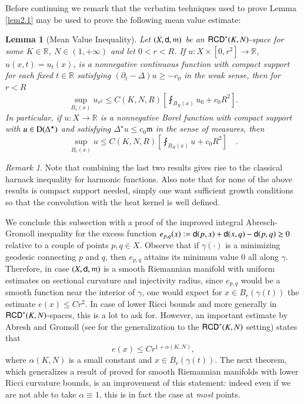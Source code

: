 \documentclass[11pt,reqno]{amsart}
\newcommand{\dom}{\rm D}
\newcommand{\mm}{\mathfrak m}
\newcommand{\sfd}{{\sf d}}
\newcommand{\R}{\mathbb{R}}
\newcommand{\RCD}{{\sf RCD}}
\newtheorem{lemma}[theorem]{Lemma}
\theoremstyle{definition}
\theoremstyle{remark}
\newtheorem{remark}{Remark}[section]
\theoremstyle{remark}
\theoremstyle{remark}
\theoremstyle{remark}
\theoremstyle{remark}
\theoremstyle{remark}
\theoremstyle{remark}
\begin{document}
Before continuing we remark that the verbatim techniques used to prove Lemma \ref{lem2.1} may be used to prove the following mean value estimate:

\begin{lemma}[Mean Value Inequality]
Let $(X,\sfd,\mm)$ be an  $\RCD^*(K,N)$-space for some $K \in \R$, $N \in (1,+\infty)$ and let $0<r<R$. If $u:X \times [0,r^2]\to \R$, $u(x,t)=u_t(x)$,  is a nonnegative  continuous function with compact support for each fixed $t\in \R$ satisfying $(\partial_t - \Delta) u \geq -c_0$ in the weak sense, then for $r<R$
\begin{equation}
\sup_{B_r(x)}u_{r^2} \leq C(K,N,R) \left[ \fint_{B_R(x)}u_{0}+ c_0 R^2 \right].
\end{equation}
In particular, if $u:X\to \R$ is a nonnegative Borel function with compact support with $u \in \dom(\Delta^\star)$ and satisfying $\Delta^\star u \leq c_0 \mm$ in the sense of measures, then
\begin{equation}\label{eq:MeanValueConst}
\sup_{B_r(x)} u \leq C(K,N,R) \left[ \fint_{B_R(x)}u+ c_0 R^2 \right] \quad.
\end{equation}
\end{lemma}
\begin{remark}
Note that combining the last two results gives rise to the classical harnack inequality for harmonic functions.  Also note that for none of the above results is compact support needed, simply one want sufficient growth conditions so that the convolution with the heat kernel is well defined.\\
\end{remark}

We conclude this subsection with a proof of the improved integral Abresch-Gromoll inequality for the excess function $e_{p,q}(x):=\sfd(p,x)+\sfd(x,q)-\sfd(p,q)\geq 0$ relative to a couple of points $p,q\in X$.  Observe that if $\gamma(\cdot)$ is a minimizing geodesic connecting $p$ and $q$, then $e_{p,q}$ attains its minimum value $0$ all along $\gamma$. Therefore, in case  $(X,\sfd,\mm)$ is a smooth Riemannian manifold with uniform estimates on sectional curvature and injectivity radius, since $e_{p,q}$ would be a smooth function near the interior of $\gamma$, one would expect  for $x \in B_r(\gamma(t))$ the estimate $e(x)\leq Cr^2$. In case of lower Ricci bounds and more generally in $\RCD^*(K,N)$-spaces,  this is a lot to ask for. However, an important estimate by Abresh and Gromoll  \cite{AG90}  (see \cite{GiMo12} for the generalization to the $\RCD^*(K,N)$ setting) states that
$$e(x)\leq C r^{1+\alpha(K,N)}, $$
where $\alpha(K,N)$ is a small constant and $x\in B_r(\gamma(t))$.  The next theorem,  which generalizes a result of \cite{CN} proved for smooth Riemannian manifolds with lower Ricci curvature bounds, is an improvement of this statement: indeed even if we are not able to take $\alpha\equiv 1$, this is in fact the case at \emph{most} points.
\end{document}
